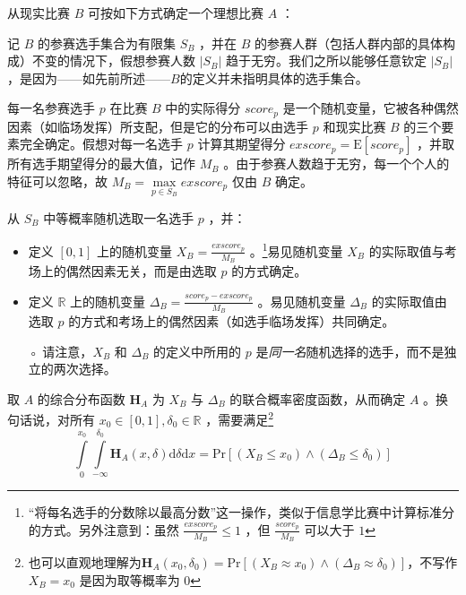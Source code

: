            \begin{definition}
                从现实比赛 $B$ 可按如下方式确定一个理想比赛 $A$ ：

                \begin{asparaenum}[\bfseries{步骤} 1.]
                    \item 记 $B$ 的参赛选手集合为有限集 $S_B$ ，并在 $B$ 的参赛人群（包括人群内部的具体构成）不变的情况下，假想参赛人数 $\left|S_B\right|$ 趋于无穷。我们之所以能够任意钦定 $\left|S_B\right|$ ，是因为——如先前所述——$B$的定义并未指明具体的选手集合。
                    \item \label{step:realToIdealStep2} 每一名参赛选手 $p$ 在比赛 $B$ 中的实际得分 $\textit{score}_p$ 是一个随机变量，它被各种偶然因素（如临场发挥）所支配，但是它的分布可以由选手 $p$ 和现实比赛 $B$ 的三个要素完全确定。假想对每一名选手 $p$ 计算其期望得分 $\textit{exscore}_p=\mathrm{E}\left[\textit{score}_p\right]$ ，并取所有选手期望得分的最大值，记作 $M_B$ 。由于参赛人数趋于无穷，每一个个人的特征可以忽略，故 $M_B=\max\limits_{p\in S_B} \textit{exscore}_p$ 仅由 $B$ 确定。
                    \item \label{step:realToIdealStep3} 从 $S_B$ 中等概率随机选取一名选手 $p$ ，并：
                    \begin{itemize}[leftmargin=4em]
                        \item 定义 $[0,1]$ 上的随机变量 $X_B=\frac{\textit{exscore}_p}{M_B}$ 。\footnote{“将每名选手的分数除以最高分数”这一操作，类似于信息学比赛中计算标准分的方式。另外注意到：虽然 $\frac{\textit{exscore}_p}{M_B}\leq 1$ ，但 $\frac{\textit{score}_p}{M_B}$ 可以大于 $1$ }易见随机变量 $X_B$ 的实际取值与考场上的偶然因素无关，而是由选取 $p$ 的方式确定。
                        \item 定义 $\mathbb{R}$ 上的随机变量 $\Delta_B=\frac{\textit{score}_p-\textit{exscore}_p}{M_B}$ 。易见随机变量 $\Delta_B$ 的实际取值由选取 $p$ 的方式和考场上的偶然因素（如选手临场发挥）共同确定。
                        \item [◦] 请注意，$X_B$ 和 $\Delta_B$ 的定义中所用的 $p$ 是\emph{同一名}随机选择的选手，而不是独立的两次选择。
                    \end{itemize}
                    \item 取 $A$ 的综合分布函数 $\bm{H}_A$ 为 $X_B$ 与 $\Delta_B$ 的联合概率密度函数，从而确定 $A$ 。换句话说，对所有 $x_0\in[0,1],\delta_0\in\mathbb{R}$ ，需要满足\footnote{也可以直观地理解为$\bm{H}_A(x_0,\delta_0)=\mathrm{Pr}\left[\left(X_B\approx x_0\right)\land\left(\Delta_B\approx\delta_0\right)\right]$，不写作 $X_B=x_0$ 是因为取等概率为 $0$ }
                    \begin{equation}
                        \int\limits_0^{x_0}\int\limits_{-\infty}^{\delta_0} \bm{H}_A(x,\delta)\mathrm{d}\delta\mathrm{d}x=\mathrm{Pr}\left[\left(X_B\leq x_0\right)\land\left(\Delta_B\leq\delta_0\right)\right]
                        \label{formula:definitionOfJointDensityFunction}
                    \end{equation}


\end{asparaenum}
\end{definition}
